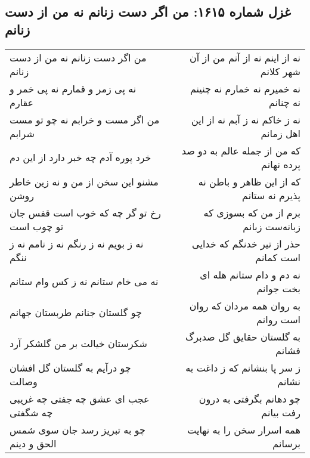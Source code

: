 \begin{center}
\section*{غزل شماره ۱۶۱۵: من اگر دست زنانم نه من از دست زنانم}
\label{sec:1615}
\begin{longtable}{l p{0.5cm} r}
من اگر دست زنانم نه من از دست زنانم
&&
نه از اینم نه از آنم من از آن شهر کلانم
\\
نه پی زمر و قمارم نه پی خمر و عقارم
&&
نه خمیرم نه خمارم نه چنینم نه چنانم
\\
من اگر مست و خرابم نه چو تو مست شرابم
&&
نه ز خاکم نه ز آبم نه از این اهل زمانم
\\
خرد پوره آدم چه خبر دارد از این دم
&&
که من از جمله عالم به دو صد پرده نهانم
\\
مشنو این سخن از من و نه زین خاطر روشن
&&
که از این ظاهر و باطن نه پذیرم نه ستانم
\\
رخ تو گر چه که خوب است قفس جان تو چوب است
&&
برم از من که بسوزی که زبانه‌ست زبانم
\\
نه ز بویم نه ز رنگم نه ز نامم نه ز ننگم
&&
حذر از تیر خدنگم که خدایی است کمانم
\\
نه می خام ستانم نه ز کس وام ستانم
&&
نه دم و دام ستانم هله ای بخت جوانم
\\
چو گلستان جنانم طربستان جهانم
&&
به روان همه مردان که روان است روانم
\\
شکرستان خیالت بر من گلشکر آرد
&&
به گلستان حقایق گل صدبرگ فشانم
\\
چو درآیم به گلستان گل افشان وصالت
&&
ز سر پا بنشانم که ز داغت به نشانم
\\
عجب ای عشق چه جفتی چه غریبی چه شگفتی
&&
چو دهانم بگرفتی به درون رفت بیانم
\\
چو به تبریز رسد جان سوی شمس الحق و دینم
&&
همه اسرار سخن را به نهایت برسانم
\\
\end{longtable}
\end{center}
